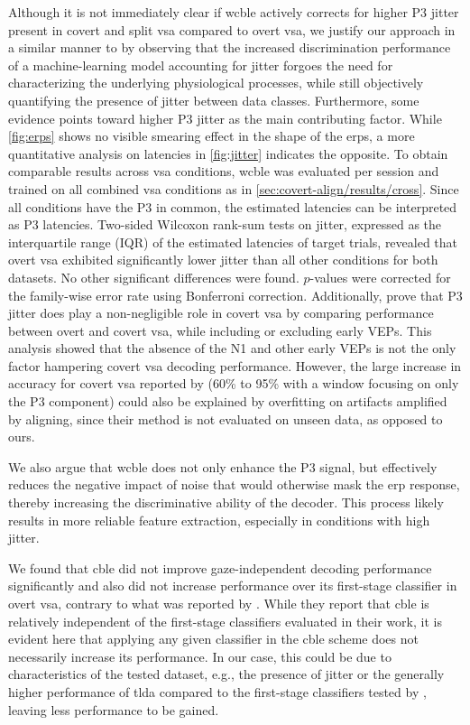 Although it is not immediately clear if \ac{wcble} actively corrects for higher P3 jitter
present in covert and split \ac{vsa} compared to overt \ac{vsa},
we justify our approach in a similar manner to \textcite{Hardiansyah2020} by
observing that the increased discrimination performance of a machine-learning
model accounting for jitter forgoes the need for characterizing the underlying
physiological processes, while still objectively quantifying the presence of
jitter between data classes.
Furthermore, some evidence points toward higher P3 jitter as the main
contributing factor.
While \autoref{fig:erps} shows no visible smearing effect in
the shape of the \acp{erp}, a more quantitative analysis on latencies in
\autoref{fig:jitter} indicates the opposite.
To obtain comparable results across \ac{vsa} conditions, \ac{wcble} was
evaluated per session and trained on all combined \ac{vsa} conditions as in
\cref{sec:covert-align/results/cross}.
Since all conditions have the P3 in common, the estimated latencies can be
interpreted as P3 latencies.
Two-sided Wilcoxon rank-sum tests on jitter, expressed as the interquartile
range (IQR) of the estimated latencies of target trials, revealed that overt
\ac{vsa} exhibited significantly lower jitter than all other conditions for
both datasets.
No other significant differences were found.
$p$-values were corrected for the family-wise error rate using Bonferroni
correction.
Additionally, \textcite{Arico2014} prove that P3 jitter does play a
non-negligible role in covert \ac{vsa} by comparing performance between
overt and covert \ac{vsa}, while including or excluding early VEPs.
This analysis showed that the absence of the N1 and other early VEPs is not the
only factor hampering covert \ac{vsa} decoding performance.
However, the large increase in accuracy for covert \ac{vsa} reported by
\textcite{Arico2014} (60\% to 95\% with a window focusing on only the P3
component) could also be explained by overfitting on artifacts amplified by
aligning, since their method is not evaluated on unseen data, as opposed to ours.

We also argue that \ac{wcble} does not only enhance the P3 signal, but effectively reduces the
negative impact of noise that would otherwise mask the \ac{erp} response, thereby increasing the
discriminative ability of the decoder.
This process likely results in more reliable feature extraction, especially in conditions
with high jitter.

We found that \ac{cble} did not improve gaze-independent decoding performance
significantly and also did not increase performance over its first-stage
classifier in overt \ac{vsa}, contrary to what was reported by \textcite{Mowla2017}.
While they report that \ac{cble} is relatively independent of the
first-stage classifiers evaluated in their work, it is evident here that
applying any given classifier in the \ac{cble} scheme does not necessarily increase
its performance.
In our case, this could be due to characteristics of the tested dataset, e.g.,
the presence of jitter or the generally higher performance of \ac{tlda} compared to the
first-stage classifiers tested by \textcite{Mowla2017}, leaving less
performance to be gained.

